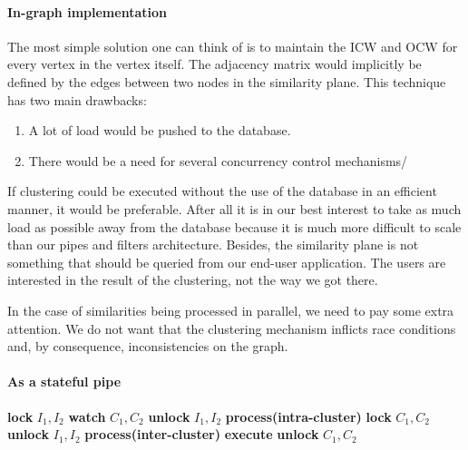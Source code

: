 \paragraph{In-graph implementation} The most simple solution one can think of is to maintain the ICW and OCW for every vertex in the vertex itself. The adjacency matrix would implicitly be defined by the edges between two nodes in the similarity plane. This technique has two main drawbacks:

\begin{enumerate}
\item A lot of load would be pushed to the database.
\item There would be a need for several concurrency control mechanisms/
\end{enumerate}

If clustering could be executed without the use of the database in an efficient manner, it would be preferable. After all it is in our best interest to take as much load as possible away from the database because it is much more difficult to scale than our pipes and filters architecture. Besides, the similarity plane is not something that should be queried from our end-user application. The users are interested in the result of the clustering, not the way we got there.

In the case of similarities being processed in parallel, we need to pay some extra attention. We do not want that the clustering mechanism inflicts race conditions and, by consequence, inconsistencies on the graph.


\paragraph{As a stateful pipe}

\begin{algorithm}
\caption{!!!}
\label{mincutgusfield}
\begin{algorithmic}
\STATE \textbf{lock} $I_1,I_2$
  \STATE \textbf{watch} $C_1,C_2$
  \STATE \textbf{unlock} $I_1,I_2$
  \STATE \textbf{process(intra-cluster)}
\ELSE
  \STATE \textbf{lock} $C_1,C_2$
  \STATE \textbf{unlock} $I_1,I_2$
  \STATE \textbf{process(inter-cluster)}
  \STATE \textbf{execute}
  \STATE \textbf{unlock} $C_1,C_2$
\ENDIF
\end{algorithmic}
\end{algorithm}
